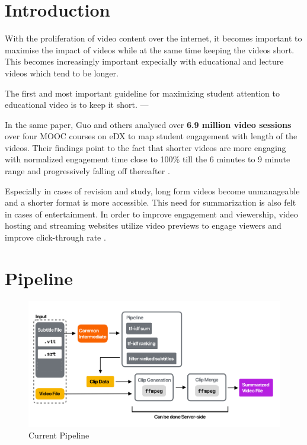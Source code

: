 \documentclass{article}
\makeatletter
\newcommand\mainmatter{%
    \cleardoublepage
  \pagenumbering{arabic}}
\makeatother
\begin{document}
\clearpage
\tableofcontents
\mainmatter
	\section{Introduction}
		With the proliferation of video content over the internet, it becomes important to maximise the impact of videos while at the same time keeping the videos short. This becomes increasingly important expecially with educational and lecture videos which tend to be longer.	
		\begin{mdframed}
			The first and most important guideline for maximizing student attention to educational video is to keep it short.
			--- \cite{brame2016effective}
		\end{mdframed}
		
		In the same paper, Guo and others analysed over \textbf{6.9 million video sessions} over four MOOC courses on eDX to map student engagement with length of the videos. Their findings point to the fact that shorter videos are more engaging with normalized engagement time close to 100\% till the 6 minutes to 9 minute range and progressively falling off thereafter \cite{guo2014video}.
		
		Especially in cases of revision and study, long form videos become unmanageable and a shorter format is more accessible. This need for summarization is also felt in cases of entertainment. In order to improve engagement and viewership, video hosting and streaming websites utilize video previews to engage viewers and improve click-through rate \cite{youtube, netflix}.
		
	\section{Pipeline}
		\begin{figure}[ht]
			\centering
				\includegraphics[width=\textwidth, keepaspectratio=true]{Graphic}	
				\caption{Current Pipeline}
				\label{currentpipeline}
		\end{figure}
\end{document}
